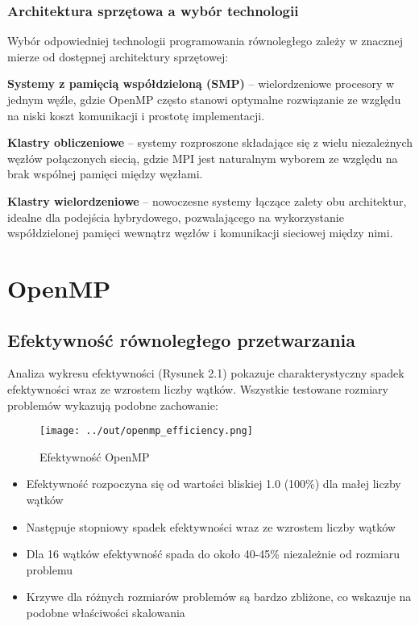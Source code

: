 \documentclass[12pt,a4paper]{report}
\begin{document}
\subsection{Architektura sprzętowa a wybór technologii}

Wybór odpowiedniej technologii programowania równoległego zależy w znacznej mierze od dostępnej architektury sprzętowej:

\textbf{Systemy z pamięcią współdzieloną (SMP)} -- wielordzeniowe procesory w jednym węźle, gdzie OpenMP często stanowi optymalne rozwiązanie ze względu na niski koszt komunikacji i prostotę implementacji.

\textbf{Klastry obliczeniowe} -- systemy rozproszone składające się z wielu niezależnych węzłów połączonych siecią, gdzie MPI jest naturalnym wyborem ze względu na brak wspólnej pamięci między węzłami.

\textbf{Klastry wielordzeniowe} -- nowoczesne systemy łączące zalety obu architektur, idealne dla podejścia hybrydowego, pozwalającego na wykorzystanie współdzielonej pamięci wewnątrz węzłów i komunikacji sieciowej między nimi.

\chapter{OpenMP}

\section{Efektywność równoległego przetwarzania}

Analiza wykresu efektywności (Rysunek 2.1) pokazuje charakterystyczny spadek efektywności wraz ze wzrostem liczby wątków. Wszystkie testowane rozmiary problemów wykazują podobne zachowanie:

\begin{figure}[h]
    \centering
    \texttt{[image: ../out/openmp\_efficiency.png]}
    \caption{Efektywność OpenMP}
    \label{fig:etykieta}
\end{figure}

\begin{itemize}
    \item Efektywność rozpoczyna się od wartości bliskiej 1.0 (100\%) dla małej liczby wątków
    \item Następuje stopniowy spadek efektywności wraz ze wzrostem liczby wątków
    \item Dla 16 wątków efektywność spada do około 40-45\% niezależnie od rozmiaru problemu
    \item Krzywe dla różnych rozmiarów problemów są bardzo zbliżone, co wskazuje na podobne właściwości skalowania
\end{itemize}
\end{document}
